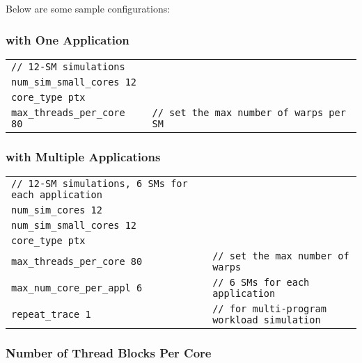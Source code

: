 \noindent Below are some sample configurations:

\subsubsection*{\gpu with One Application}

\begin{tabular}{l l}
 \Verb+// 12-SM simulations+ & \Verb++ \\
 \Verb+num_sim_small_cores 12+ & \Verb++ \\
 \Verb+core_type ptx+ & \Verb++ \\
 \Verb+max_threads_per_core 80+ & \Verb+// set the max number of warps per SM+
\end{tabular}

\subsubsection*{\gpu with Multiple Applications}

\begin{tabular}{l l}
 \Verb+// 12-SM simulations, 6 SMs for each application+ & \Verb++ \\
 \Verb+num_sim_cores 12+ & \Verb++ \\
 \Verb+num_sim_small_cores 12+ & \Verb++ \\
 \Verb+core_type ptx+ & \Verb++ \\
 \Verb+max_threads_per_core 80+ & \Verb+// set the max number of warps + \\
 \Verb+max_num_core_per_appl 6+ & \Verb+// 6 SMs for each application+ \\
 \Verb+repeat_trace 1+ & \Verb+// for multi-program workload simulation+
\end{tabular}

\subsubsection{Number of Thread Blocks Per Core}

